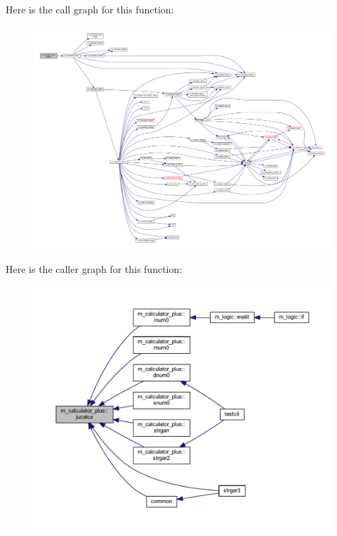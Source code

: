 Here is the call graph for this function\+:
\nopagebreak
\begin{figure}[H]
\begin{center}
\leavevmode
\includegraphics[width=350pt]{namespacem__calculator__plus_ac6f5a1bd3d8be798af932c006a72b123_cgraph}
\end{center}
\end{figure}
Here is the caller graph for this function\+:
\nopagebreak
\begin{figure}[H]
\begin{center}
\leavevmode
\includegraphics[width=350pt]{namespacem__calculator__plus_ac6f5a1bd3d8be798af932c006a72b123_icgraph}
\end{center}
\end{figure}
\mbox{\label{namespacem__calculator__plus_a448c42e7171e27c1f4a8e339687b0e3f}} 
